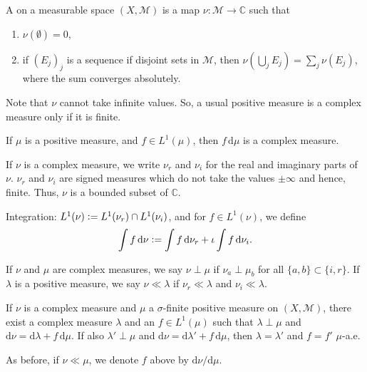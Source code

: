 \documentclass[12pt]{article}	%
\begin{document}
\begin{defn}
	A  on a measurable space $(X, \mathcal{M})$ is a map $\nu : \mathcal{M} \to \mathbb{C}$ such that
	\begin{enumerate}
		\item $\nu(\emptyset) = 0$,
		\item if $(E_{j})_{j}$ is a sequence if disjoint sets in $\mathcal{M}$, then $\nu(\bigcup_{j} E_{j}) = \sum_{j} \nu(E_{j})$, where the sum converges absolutely.
	\end{enumerate}
\end{defn}
Note that $\nu$ cannot take infinite values. So, a usual positive measure is a complex measure only if it is finite. 
\begin{ex}
	If $\mu$ is a positive measure, and $f \in L^{1}(\mu)$, then $f \,{\mathrm d}\mu$ is a complex measure.
\end{ex}

If $\nu$ is a complex measure, we write $\nu_{r}$ and $\nu_{i}$ for the real and imaginary parts of $\nu$. $\nu_{r}$ and $\nu_{i}$ are signed measures which do not take the values $\pm \infty$ and hence, finite. Thus, $\nu$ is a bounded subset of $\mathbb{C}$.

Integration: $L^{1}(\nu) \vcentcolon= L^{1}(\nu_{r}) \cap L^{1}(\nu_{i})$, and for $f \in L^{1}(\nu)$, we define
\begin{equation*} 
	\int f \,{\mathrm{d}}\nu \vcentcolon= \int f \,{\mathrm{d}}\nu_{r} + \iota \int f \,{\mathrm{d}}\nu_{i}.
\end{equation*}

If $\nu$ and $\mu$ are complex measures, we say $\nu \perp \mu$ if $\nu_{a} \perp \mu_{b}$ for all $\{a, b\} \subset \{i, r\}$. If $\lambda$ is a positive measure, we say $\nu \ll \lambda$ if $\nu_{r} \ll \lambda$ and $\nu_{i} \ll \lambda$.

\begin{thm}
	If $\nu$ is a complex measure and $\mu$ a $\sigma$-finite positive measure on $(X, \mathcal{M})$, there exist a complex measure $\lambda$ and an $f \in L^{1}(\mu)$ such that $\lambda \perp \mu$ and ${\mathrm d} \nu = {\mathrm d} \lambda + f \, {\mathrm d} \mu$. \newline
	If also $\lambda' \perp \mu$ and ${\mathrm d} \nu = {\mathrm d} \lambda' + f \, {\mathrm d} \mu$, then $\lambda = \lambda'$ and $f = f'$ $\mu$-a.e.
\end{thm}
As before, if $\nu \ll \mu$, we denote $f$ above by ${\mathrm d}\nu/{\mathrm d}\mu$.
\end{document}
